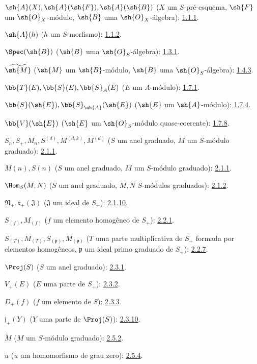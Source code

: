 \documentclass[oneside,10pt]{amsart}
\begin{document}
\begingroup
\small
\setlength{\parindent}{0pt}
\setlength{\parskip}{2pt}

$\sh{A}(X),\sh{A}(\sh{F}),\sh{A}(\sh{B})$
($X$ um $S$-pré-esquema, $\sh{F}$ um $\sh{O}_X$-módulo,
$\sh{B}$ uma $\sh{O}_X$-álgebra): \hyperref[II.1.1.1]{1.1.1}.

$\sh{A}(h)$ ($h$ um $S$-morfismo): \hyperref[II.1.1.2]{1.1.2}.

$\Spec(\sh{B})$ ($\sh{B}$ uma $\sh{O}_S$-álgebra): \hyperref[II.1.3.1]{1.3.1}.

$\widetilde{\sh{M}}$ ($\sh{M}$ um $\sh{B}$-módulo,
$\sh{B}$ uma $\sh{O}_S$-álgebra): \hyperref[II.1.4.3]{1.4.3}.

$\bb{T}(E),\bb{S}(E),\bb{S}_A(E)$ ($E$ um $A$-módulo): \hyperref[II.1.7.1]{1.7.1}.

$\bb{S}(\sh{E}),\bb{S}_{\sh{A}}(\sh{E})$
($\sh{E}$ um $\sh{A}$-módulo): \hyperref[II.1.7.4]{1.7.4}.

$\bb{V}(\sh{E})$ ($\sh{E}$ um $\sh{O}_S$-módulo quase-coerente): \hyperref[II.1.7.8]{1.7.8}.

$S_n,S_+,M_n,S^{(d)},M^{(d,k)},M^{(d)}$
($S$ um anel graduado, $M$ um $S$-módulo graduado): \hyperref[II.2.1.1]{2.1.1}.

$M(n),S(n)$ ($S$ um anel graduado, $M$ um $S$-módulo graduado): \hyperref[II.2.1.1]{2.1.1}.

$\Hom_S(M,N)$ ($S$ um anel graduado, $M,N$ $S$-módulos graduados): \hyperref[II.2.1.2]{2.1.2}.

$\mathfrak N_+,\mathfrak r_+(\mathfrak J)$
($\mathfrak J$ um ideal de $S_+$): \hyperref[II.2.1.10]{2.1.10}.

$S_{(f)},M_{(f)}$ ($f$ um elemento homogêneo de $S_+$): \hyperref[II.2.2.1]{2.2.1}.

$S_{(T)},M_{(T)},S_{(\mathfrak p)},M_{(\mathfrak p)}$
($T$ uma parte multiplicativa de $S_+$ formada por elementos homogêneos,
$\mathfrak p$ um ideal primo graduado de $S_+$): \hyperref[II.2.2.7]{2.2.7}.

$\Proj(S)$ ($S$ um anel graduado): \hyperref[II.2.3.1]{2.3.1}.

$V_+(E)$ ($E$ uma parte de $S_+$): \hyperref[II.2.3.2]{2.3.2}.

$D_+(f)$ ($f$ um elemento de $S$): \hyperref[II.2.3.3]{2.3.3}.

$\mathfrak j_+(Y)$ ($Y$ uma parte de $\Proj(S)$): \hyperref[II.2.3.10]{2.3.10}.

$\widetilde M$ ($M$ um $S$-módulo graduado): \hyperref[II.2.5.2]{2.5.2}.

$\widetilde u$ ($u$ um homomorfismo de grau zero): \hyperref[II.2.5.4]{2.5.4}.
\end{document}

